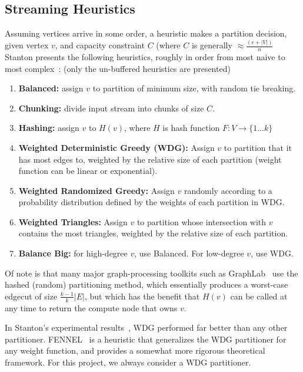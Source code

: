 \documentclass[11pt]{article}
\begin{document}
\subsection{Streaming Heuristics}
Assuming vertices arrive in some order, a heuristic makes a partition decision, given vertex $v$, and capacity constraint $C$ (where $C$ is generally $\approx \frac{(\epsilon+|V|)}{n}$ Stanton presents the following heuristics, roughly in order from most naive to most complex~\cite{Stanton:2012:SGP:2339530.2339722}: (only the un-buffered heuristics are presented)

\begin{enumerate}
\item \textbf{Balanced:} assign $v$ to partition of minimum size, with random tie breaking.
\item \textbf{Chunking:} divide input stream into chunks of size $C$.
\item \textbf{Hashing:} assign $v$ to $H(v)$, where $H$ is hash function $F:V\to\{1\dots k\}$
\item \textbf{Weighted Deterministic Greedy (WDG):} Assign $v$ to partition that it has most edges to, weighted by the relative size of each partition (weight function can be linear or exponential).
\item \textbf{Weighted Randomized Greedy:} Assign $v$ randomly according to a probability distribution defined by the weights of each partition in WDG.
\item \textbf{Weighted Triangles:} Assign $v$ to partition whose intersection with $v$ contains the most triangles, weighted by the relative size of each partition.
\item \textbf{Balance Big:} for high-degree $v$, use Balanced. For low-degree $v$, use WDG. 
\end{enumerate}

Of note is that many major graph-processing toolkits such as GraphLab~\cite{Low:2012:DGF:2212351.2212354} use the hashed (random) partitioning method, which essentially produces a worst-case edgecut of size $\frac{k-1}{k}|E|$, but which has the benefit that $H(v)$ can be called at any time to return the compute node that owns $v$. 

In Stanton's experimental results~\cite{Stanton:2012:SGP:2339530.2339722}, WDG performed far better than any other partitioner. FENNEL~\cite{tsourakakis2012fennel} is a heuristic that generalizes the WDG partitioner for any weight function, and provides a somewhat more rigorous theoretical framework. For this project, we always consider a WDG partitioner. 
\end{document}
